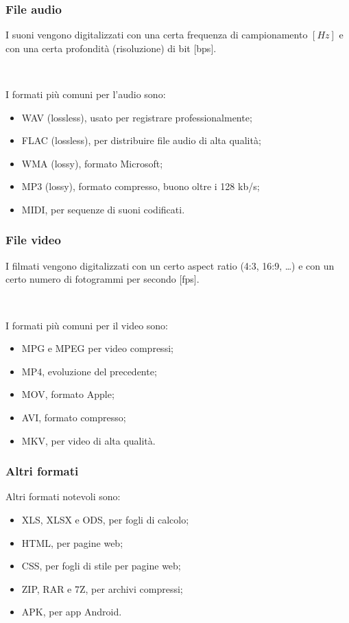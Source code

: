 \documentclass[handout]{beamer}
\begin{document}
\begin{frame}
\frametitle{File audio}
I suoni vengono digitalizzati con una certa \alert<1>{frequenza di campionamento} $ [Hz] $ e con una certa \alert<1>{profondità (risoluzione) di bit} [bps].\pause

~

I formati più comuni per l'audio sono:
\begin{itemize}
  \item WAV (lossless), usato per registrare professionalmente;\pause
  \item FLAC (lossless), per distribuire file audio di alta qualità;\pause
  \item WMA (lossy), formato Microsoft;\pause
  \item MP3 (lossy), formato compresso, buono oltre i 128 kb/s;\pause
  \item MIDI, per sequenze di suoni codificati.
\end{itemize}
\end{frame}


\begin{frame}
\frametitle{File video}
I filmati vengono digitalizzati con un certo \alert<1>{aspect ratio} (4:3, 16:9, \ldots) e con un certo numero di \alert<1>{fotogrammi per secondo} [fps].\pause

~

I formati più comuni per il video sono:
\begin{itemize}
  \item MPG e MPEG per video compressi;\pause
  \item MP4, evoluzione del precedente;\pause
  \item MOV, formato Apple;\pause
  \item AVI, formato compresso;\pause
  \item MKV, per video di alta qualità.
\end{itemize}
\end{frame}


\begin{frame}
\frametitle{Altri formati}
Altri formati notevoli sono:
\begin{itemize}
  \item XLS, XLSX e ODS, per fogli di calcolo;\pause
  \item HTML, per pagine web;\pause
  \item CSS, per fogli di stile per pagine web;\pause
  \item ZIP, RAR e 7Z, per archivi compressi;\pause
  \item APK, per app Android.
\end{itemize}
\end{frame}
\end{document}
